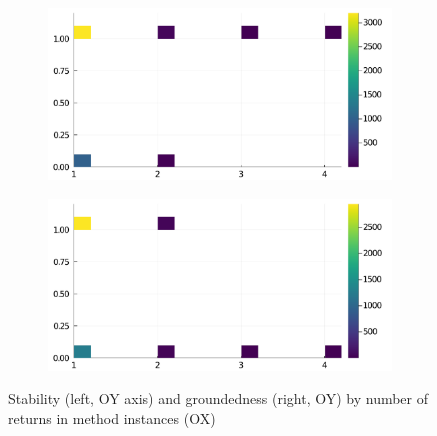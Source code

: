\begin{figure}[h]
     \begin{subfigure}[b]{0.49\textwidth}
       \includegraphics[width=\textwidth]{figs/all-package-graphs/Flux-returns-vs-stable.pdf}
     \end{subfigure}
     \begin{subfigure}[b]{0.49\textwidth}
       \includegraphics[width=\textwidth]{figs/all-package-graphs/Flux-returns-vs-grounded.pdf}
     \end{subfigure}
\caption{Stability (left, OY axis) and groundedness (right, OY) by number of returns in method instances (OX)}%
%
\label{figs:returns:Flux}
\end{figure}
\clearpage

